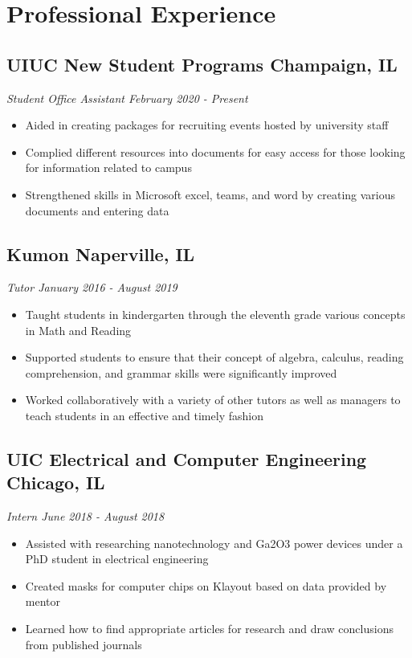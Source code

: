\documentclass[10pt]{article}
\newcommand{\positiontitle}[1]
        {
            \hspace{-1.8em}
            \textit{#1}
        }
\newcommand{\makepositionheader}[2]
    {
        \subsection{#1 \hfill {\normalsize #2}}
    }
\newcommand{\makepositiondesc}[2]
    {
        \positiontitle{#1 \hfill {\normalsize #2}}    
    }
\newcommand{\contentitem}
    {
        \item\small
    }
\begin{document}
                                                \section{Professional Experience}
                                    \makepositionheader{UIUC New Student Programs}{Champaign, IL}
                                    \makepositiondesc{Student Office Assistant}{February 2020 - Present}
                    \begin{itemize}
                                                    \contentitem Aided in creating packages for recruiting events hosted by university staff
                                                    \contentitem Complied different resources into documents for easy access for those looking for information related to campus
                                                    \contentitem Strengthened skills in Microsoft excel, teams, and word by creating various documents and entering data
                                            \end{itemize}
                                            \makepositionheader{Kumon}{Naperville, IL}
                                    \makepositiondesc{Tutor}{January 2016 - August 2019}
                    \begin{itemize}
                                                    \contentitem Taught students in kindergarten through the eleventh grade various concepts in Math and Reading
                                                    \contentitem Supported students to ensure that their concept of algebra, calculus, reading comprehension, and grammar skills were significantly improved
                                                    \contentitem Worked collaboratively with a variety of other tutors as well as managers to teach students in an effective and timely fashion
                                            \end{itemize}
                                            \makepositionheader{UIC Electrical and Computer Engineering}{Chicago, IL}
                                    \makepositiondesc{Intern}{June 2018 - August 2018}
                    \begin{itemize}
                                                    \contentitem Assisted with researching nanotechnology and Ga2O3 power devices under a PhD student in electrical engineering
                                                    \contentitem Created masks for computer chips on Klayout based on data provided by mentor
                                                    \contentitem Learned how to find appropriate articles for research and draw conclusions from published journals
                                            \end{itemize}
\end{document}
